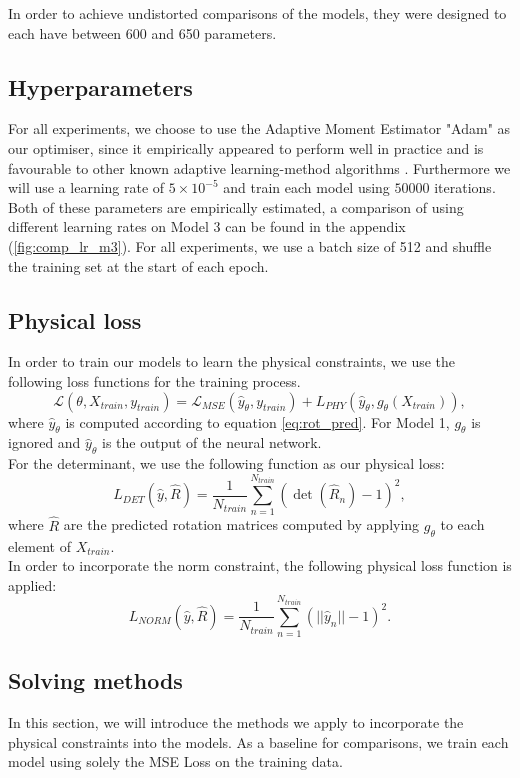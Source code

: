\indent In order to achieve undistorted comparisons of the models, they were designed to each have between 600 and 650 parameters.

\subsection{Hyperparameters}
For all experiments, we choose to use the Adaptive Moment Estimator "Adam" as our optimiser, since it empirically appeared to perform well in practice and is favourable to other known adaptive learning-method algorithms \cite{DBLP:journals/corr/Ruder16}. Furthermore we will use a learning rate of $5\times 10^{-5}$ and train each model using $50000$ iterations. Both of these parameters are empirically estimated, a comparison of using different learning rates on Model 3 can be found in the appendix (\ref{fig:comp_lr_m3}). For all experiments, we use a batch size of 512 and shuffle the training set at the start of each epoch.

\subsection{Physical loss}
In order to train our models to learn the physical constraints, we use the following loss functions for the training process.
\[\mathcal{L}(\theta, X_{train}, y_{train}) = \mathcal{L}_{MSE}(\hat{y}_\theta, y_{train}) + L_{PHY}(\hat{y}_\theta, g_\theta(X_{train})),\]
where $\hat{y}_\theta$ is computed according to equation \ref{eq:rot_pred}. For Model 1, $g_\theta$ is ignored and $\hat{y}_\theta$ is the output of the neural network.\\
For the determinant, we use the following function as our physical loss:
\[L_{DET}(\hat{y}, \hat{R}) = \frac{1}{N_{train}}\sum_{n = 1}^{N_{train}}(\det(\hat{R}_n) - 1)^2,\]
where $\hat{R}$ are the predicted rotation matrices computed by applying $g_\theta$ to each element of $X_{train}$.\\
In order to incorporate the norm constraint, the following physical loss function is applied:
\[L_{NORM}(\hat{y}, \hat{R}) = \frac{1}{N_{train}}\sum_{n = 1}^{N_{train}}(||\hat{y}_n|| - 1)^2. \]

\subsection{Solving methods}
In this section, we will introduce the methods we apply to incorporate the physical constraints into the models. As a baseline for comparisons, we train each model using solely the MSE Loss on the training data.


